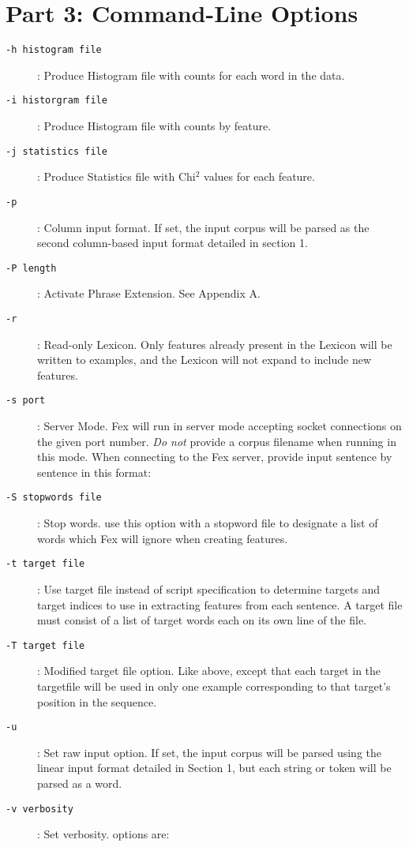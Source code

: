 \documentclass[11pt]{article}
\begin{document}
\section*{Part 3: Command-Line Options}
\begin{description}
\item[{\tt -h histogram file}] : Produce Histogram file with counts for each word in the data.
\item[{\tt -i historgram file}] : Produce Histogram file with counts by feature.
\item[{\tt -j statistics file}] : Produce Statistics file with Chi$^2$ values
for each feature.
\item[{\tt -p}] : Column input format.  If set, the input corpus will be parsed
   as the second column-based input format detailed in section 1. 
\item[{\tt -P length}] : Activate Phrase Extension.  See Appendix A.
\item[{\tt -r}] : Read-only Lexicon.  Only features already present in the 
Lexicon will be written to examples, and the Lexicon will not expand to include
new features.
\item[{\tt -s port}] : Server Mode.  Fex will run in server mode
accepting socket connections on the given port number.  {\em Do not} provide
a corpus filename when running in this mode.  When connecting to the Fex server,
provide input sentence by sentence in this format:
\item[{\tt -S stopwords file}] : Stop words.  use this option with a
stopword file to designate a list of words which Fex will ignore when
creating features.
\item[{\tt -t target file}] : Use target file instead of script
specification to determine targets and target indices to use in extracting
features from each sentence.  A target file must consist of a list of target 
words each on its own line of the file.
\item[{\tt -T target file}] : Modified target file option.  Like above,
except that each target in the targetfile will be used in only one example 
corresponding to that target's position in the sequence.
\item[{\tt -u}] : Set raw input option.  If set, the input corpus will be parsed
using the linear input format detailed in Section 1, but each string or token
will be parsed as a word.
\item[{\tt -v verbosity}] : Set verbosity.  options are:
\begin{description}

\end{description}
\end{description}
\end{document}
